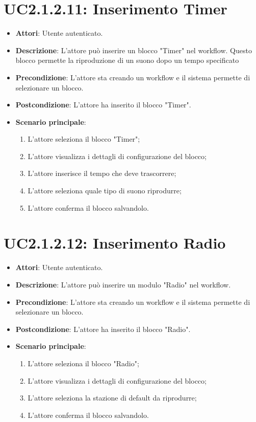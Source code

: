 \section{UC2.1.2.11: Inserimento Timer}
\label{UC2.1.2.11}
\begin{itemize}
	\item \textbf{Attori}: Utente autenticato.
	\item \textbf{Descrizione}: L'attore può inserire un blocco "Timer" nel workflow. Questo blocco permette la riproduzione di un suono dopo un tempo specificato
	\item \textbf{Precondizione}: L'attore sta creando un workflow e il sistema permette di selezionare un blocco.
	\item \textbf{Postcondizione}: L'attore ha inserito il blocco "Timer".
	\item \textbf{Scenario principale}:
	\begin{enumerate} \item L'attore seleziona il blocco "Timer"; \item L'attore visualizza i dettagli di configurazione del blocco; \item  L'attore inserisce il tempo che deve trascorrere;  \item  L'attore seleziona quale tipo di suono riprodurre; \item L'attore conferma il blocco salvandolo.\end{enumerate}
\end{itemize}

\section{UC2.1.2.12: Inserimento Radio}
\label{UC2.1.2.12}
\begin{itemize}
	\item \textbf{Attori}: Utente autenticato.
	\item \textbf{Descrizione}: L'attore può inserire un modulo "Radio" nel workflow.
	\item \textbf{Precondizione}: L'attore sta creando un workflow e il sistema permette di selezionare un blocco.
	\item \textbf{Postcondizione}: L'attore ha inserito il blocco "Radio".
	\item \textbf{Scenario principale}:
	\begin{enumerate} \item L'attore seleziona il blocco "Radio"; \item L'attore visualizza i dettagli di configurazione del blocco; \item  L'attore seleziona la stazione di default da riprodurre; \item L'attore conferma il blocco salvandolo.\end{enumerate}
\end{itemize}

